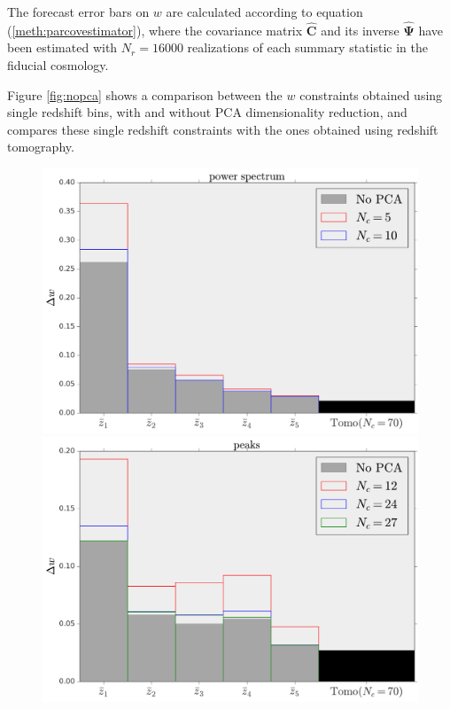 \documentclass[reprint,aps,prd,superscriptaddress,showkeys,showpacs]{revtex4-1}
\newcommand{\bbh}[1]{\mathbf{\hat{#1}}}
\begin{document}
The forecast error bars on $w$ are calculated according to equation (\ref{meth:parcovestimator}), where the covariance matrix $\bbh{C}$ and its inverse $\bbh{\Psi}$ have been estimated with $N_r=16000$ realizations of each summary statistic in the fiducial cosmology.

Figure \ref{fig:nopca} shows a comparison between the $w$ constraints obtained using single redshift bins, with and without PCA dimensionality reduction, and compares these single redshift constraints with the ones obtained using redshift tomography. 

\begin{figure}
\includegraphics[scale=0.3]{Figures/w_power_spectrum_no_pca.pdf}
\includegraphics[scale=0.3]{Figures/w_peaks_no_pca.pdf}

\end{figure}
\end{document}
